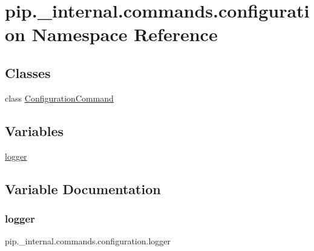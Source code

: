 \hypertarget{namespacepip_1_1__internal_1_1commands_1_1configuration}{}\section{pip.\+\_\+internal.\+commands.\+configuration Namespace Reference}
\label{namespacepip_1_1__internal_1_1commands_1_1configuration}
\subsection*{Classes}
\begin{DoxyCompactItemize}
\item 
class \hyperlink{classpip_1_1__internal_1_1commands_1_1configuration_1_1ConfigurationCommand}{Configuration\+Command}
\end{DoxyCompactItemize}
\subsection*{Variables}
\begin{DoxyCompactItemize}
\item 
\hyperlink{namespacepip_1_1__internal_1_1commands_1_1configuration_a4ec23c5f41d5419e046e6345f029b446}{logger}
\end{DoxyCompactItemize}


\subsection{Variable Documentation}
\mbox{\label{namespacepip_1_1__internal_1_1commands_1_1configuration_a4ec23c5f41d5419e046e6345f029b446}} 
\subsubsection{\texorpdfstring{logger}{logger}}
{\footnotesize\ttfamily pip.\+\_\+internal.\+commands.\+configuration.\+logger}


